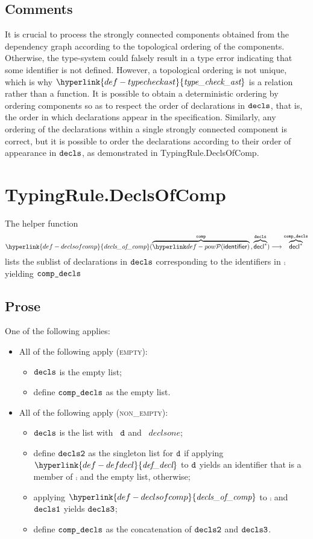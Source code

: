 \documentclass{book}
\newcommand\defdecl[0]{\hyperlink{def-defdecl}{\textfunc{def\_decl}}}
\newcommand\typecheckast[0]{\hyperlink{def-typecheckast}{\textfunc{type\_check\_ast}}}
\newcommand\declsofcomp[0]{\hyperlink{def-declsofcomp}{\textfunc{decls\_of\_comp}}}
\begin{document}
\subsection{Comments}
It is crucial to process the strongly connected components obtained from the dependency graph
according to the topological ordering of the components. Otherwise, the type-system could
falsely result in a type error indicating that some identifier is not defined.
However, a topological ordering is not unique, which is why $\typecheckast$ is a relation rather than
a function.
It is possible to obtain a deterministic ordering by ordering components so as to respect
the order of declarations in $\texttt{decls}$, that is,
the order in which declarations appear in the specification.
Similarly, any ordering of the declarations within a single strongly connected component is correct,
but it is possible to order the declarations according to their order of appearance in $\texttt{decls}$,
as demonstrated in TypingRule.DeclsOfComp.


\section{TypingRule.DeclsOfComp \label{sec:TypingRule.DeclsOfComp}}
\hypertarget{def-declsofcomp}{}
The helper function
\[
\declsofcomp(
  \overname{\pow{\identifier}}{\comp} \aslsep
  \overname{\decl^*}{\decls}
) \aslto \overname{\decl^*}{\compdecls}
\]
lists the sublist of declarations in $\texttt{decls}$ corresponding to the identifiers in $\comp$
yielding $\texttt{comp\_decls}$

\subsection{Prose}
One of the following applies:
\begin{itemize}
  \item All of the following apply (\textsc{empty}):
  \begin{itemize}
    \item $\texttt{decls}$ is the empty list;
    \item define $\texttt{comp\_decls}$ as the empty list.
  \end{itemize}

  \item All of the following apply (\textsc{non\_empty}):
  \begin{itemize}
    \item $\texttt{decls}$ is the list with \head\ $\texttt{d}$ and \tail\ $declsone$;
    \item define $\texttt{decls2}$ as the singleton list for $\texttt{d}$ if applying $\defdecl$ to $\texttt{d}$ yields an identifier
          that is a member of $\comp$ and the empty list, otherwise;
    \item applying $\declsofcomp$ to $\comp$ and $\texttt{decls1}$ yields $\texttt{decls3}$;
    \item define $\texttt{comp\_decls}$ as the concatenation of $\texttt{decls2}$ and $\texttt{decls3}$.
  \end{itemize}
\end{itemize}
\end{document}
